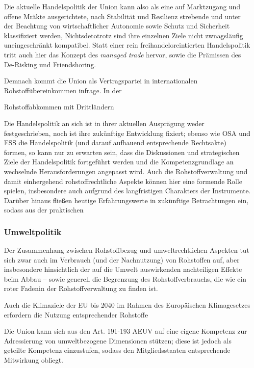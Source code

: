 \documentclass[12pt,a4paper,oneside]{book} %
\begin{document}
Die aktuelle Handelspolitik der Union kann also als eine auf Marktzugang und offene Mräkte ausgerichtete, nach Stabilität und Resilienz strebende und unter der Beachtung von wirtschaftlicher Autonomie sowie Schutz und Sicherheit klassifiziert werden,\autocite{RdTW 2024, 216} Nichtsdetotrotz sind ihre einzelnen Ziele nicht zwnagsläufig uneingeschränkt kompatibel.\autocite{RdTW 2024, 206} Statt einer rein freihandeloreintierten Handelspolitik tritt auch hier das Konzept des \textit{managed trade} hervor, sowie die Prämissen des De-Risking und Friendshoring.

Demnach kommt die Union als Vertragspartei in internationalen Rohstoffübereinkommen infrage.\autocite{Schorkopf, Rohstoffverwaltung, Rn. 43} In der 
	
	
Rohstoffabkommen mit Drittländern

Die Handelspolitik an sich ist in ihrer aktuellen Ausprägung weder festgeschrieben, noch ist ihre zukünftige Entwicklung fixiert; ebenso wie OSA und ESS die Handelspolitik (und darauf aufbauend entsprechende Rechtsakte) formen, so kann nur zu erwarten sein, dass die Diskussionen und strategischen Ziele der Handelspolitik fortgeführt werden und die Kompetenzgrundlage an wechselnde Herausforderungen angepasst wird. Auch die Rohstoffverwaltung und damit einhergehend rohstoffrechtliche Aspekte können hier eine formende Rolle spielen, insbesondere auch aufgrund des langfristigen Charakters der Instrumente. Darüber hinaus fließen heutige Erfahrungswerte in zukünftige Betrachtungen ein, sodass aus der praktischen 
	
	
\subsubsection{Umweltpolitik}
Der Zusammenhang zwischen Rohstoffbezug und umweltrechtlichen Aspekten tut sich zwar auch im Verbrauch (und der Nachnutzung) von Rohstoffen auf, aber insbesondere hinsichtlich der auf die Umwelt auswirkenden nachteiligen Effekte beim Abbau -- sowie generell die Begrenzung des Rohstoffverbrauchs, die \glqq wie ein roter Faden\grqq in der Rohstoffverwaltung zu finden ist\autocite{Schorkopf, Rohstoffverwaltung, Rn. 30}.

Auch die Klimaziele der EU bis 2040 im Rahmen des Europäischen Klimagesetzes erfordern die Nutzung entsprechender Rohstoffe

Die Union kann sich aus den Art. 191-193 AEUV auf eine eigene Kompetenz zur Adressierung von umweltbezogene Dimensionen stützen; diese ist jedoch als geteilte Kompetenz einzustufen, sodass den Mitgliedsstaaten entsprechende Mitwirkung obliegt.
	
\end{document}
